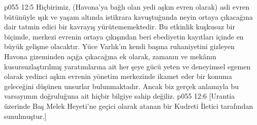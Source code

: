 \vs p055 12:5 Hiçbirimiz, (Havona’ya bağlı olan yedi aşkın evren olarak) asli evren bütünüyle ışık ve yaşam altında istikrara kavuştuğunda neyin ortaya çıkacağına dair tatmin edici bir kavrayış yürütememektedir. Bu etkinlik kuşkusuz bir biçimde, merkezi evrenin ortaya çıkışından beri ebediyetin kayıtları içinde en büyük gelişme olacaktır. Yüce Varlık’ın kendi başına ruhaniyetini gizleyen Havona gizeminden açığa çıkacağına ek olarak, zamanın ve mekânın kusursuzlaştırılmış yaratımlarına ait her şeye gücü yeten ve deneyimsel egemen olarak yedinci aşkın evrenin yönetim merkezinde ikamet eder bir konuma geleceğini düşünen unsurlar bulunmaktadır. Ancak biz gerçek anlamıyla bu varsayımın doğruluğuna ait hiçbir bilgiye sahip değiliz.
\vs p055 12:6 [Urantia üzerinde Baş Melek Heyeti’ne geçici olarak atanan bir Kudreti İletici tarafından sunulmuştur.]
